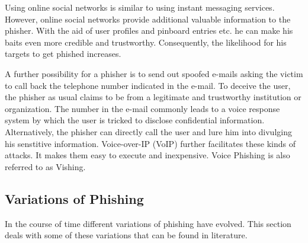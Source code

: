 \begin{description}[leftmargin=0cm]
	\item[Online Social Networks] Using online social networks is similar to using instant messaging services.
 However, online social networks provide additional valuable information to the phisher.
 With the aid of user profiles and pinboard entries etc.
 he can make his baits even more credible and trustworthy.
 Consequently, the likelihood for his targets to get phished increases.

	\item[Voice Phishing] A further possibility for a phisher is to send out spoofed e-mails asking the victim to call back the telephone number indicated in the e-mail.
 To deceive the user, the phisher as usual claims to be from a legitimate and trustworthy institution or organization.
 The number in the e-mail commonly leads to a voice response system by which the user is tricked to disclose confidential information.
 Alternatively, the phisher can directly call the user and lure him into divulging his senstitive information.
 Voice-over-IP (VoIP) further facilitates these kinds of attacks.
 It makes them easy to execute and inexpensive.
 Voice Phishing is also referred to as Vishing.

\end{description}

\subsection{Variations of Phishing}
In the course of time different variations of phishing have evolved.
 This section deals with some of these variations that can be found in literature.

\label{s:phishing_variations}

